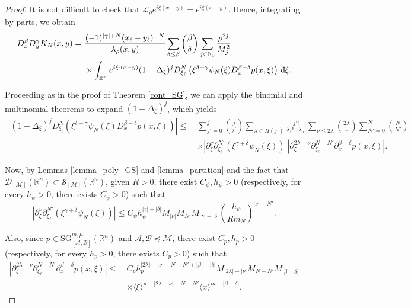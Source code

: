 \documentclass[11pt,reqno]{amsart}
\numberwithin{equation}{section}
\newcommand{\dbar}{\mathrm{d}\hspace*{-0.15em}\bar{}\hspace*{0.1em}}
\newcommand{\R}{{\mathbb{R}}} %
\newcommand{\N}{{\mathbb{N}}} %
\newcommand{\caS}{{\mathcal{S}}}
\newcommand{\SG}{{\mathrm{SG}}}
\newcommand{\M}{{\mathcal{M}}} %
\newcommand{\A}{{\mathcal{A}}} %
\newcommand{\B}{{\mathcal{B}}} %
\begin{document}
\begin{proof}
	It is not difficult to check that $\mathcal{L}_\rho e^{i\xi(x-y)} = e^{i\xi(x-y)}$. Hence, integrating by parts, we obtain
	\begin{align*}
		D_x^\beta D_y^\gamma K_N(x,y) =\ & \frac{(-1)^{|\gamma|+N}(x_\ell-y_\ell)^{-N}}{\lambda_\rho(x,y)}\sum_{\delta\leq\beta}\binom{\beta}{\delta} \sum_{j\in\N_0}\frac{\rho^{2j}}{M_j^2}\\
		& \times \int_{\R^n}e^{i\xi\cdot (x-y)}(1-\Delta_\xi)^j D_{\xi_\ell}^N\left(\xi^{\delta+\gamma}\psi_N(\xi) D_x^{\beta-\delta}p(x,\xi)\right)\,\dbar\xi.
	\end{align*}
	
	Proceeding as in the proof of Theorem \ref{cont_SG}, we can apply the binomial and multinomial theorems to expand $(1-\Delta_\xi)^j$, which yields
	\begin{align*}
		\left| (1-\Delta_\xi)^j D_{\xi_\ell}^N\left(\xi^{\delta+\gamma}\psi_N(\xi) D_x^{\beta-\delta}p(x,\xi)\right) \right| \leq\ & \sum_{j'=0}^j\binom{j}{j'}\sum_{\lambda\in\Pi(j')}\frac{j'!}{\lambda_1!\cdots\lambda_n!}\sum_{\nu\leq 2\lambda}\binom{2\lambda}{\nu}\sum_{N'=0}^N\binom{N}{N'}\\
		& \times |\partial_\xi^\nu\partial_{\xi_\ell}^{N'}(\xi^{\gamma+\delta}\psi_N(\xi))||\partial_\xi^{2\lambda-\nu}\partial_{\xi_\ell}^{N-N'}\partial_{x}^{\beta-\delta}p(x,\xi)|.
	\end{align*}
	
	Now, by Lemmas \ref{lemma_poly_GS} and \ref{lemma_partition} and the fact that $\mathcal{D}_{[\M]}(\R^n)\subset\caS_{[\M]}(\R^n)$, given $R>0$, there exist $C_\psi,h_\psi>0$ (respectively, for every $h_\psi>0$, there exists $C_\psi>0$) such that
	\begin{equation*}
		|\partial_\xi^\nu\partial_{\xi_\ell}^{N'}(\xi^{\gamma+\delta}\psi_N(\xi))| \leq C_\psi h_\psi^{|\gamma|+|\delta|} M_{|\nu|}M_{N'}M_{|\gamma|+|\delta|}\left(\frac{h_\psi}{Rm_N}\right)^{|\nu|+N'}.
	\end{equation*}
	
	Also, since $p\in {\SG}_{[\A,\B]}^{m,\mu}(\R^n)$ and $\A,\B\preceq \M$, there exist $C_p,h_p>0$ (respectively, for every $h_p>0$, there exists $C_p>0$) such that
	\begin{align*}
		|\partial_\xi^{2\lambda-\nu}\partial_{\xi_\ell}^{N-N'}\partial_{x}^{\beta-\delta}p(x,\xi)| \leq\ & C_ph_p^{|2\lambda|-|\nu|+N-N'+|\beta|-|\delta|}M_{|2\lambda|-|\nu|}M_{N-N'}M_{|\beta-\delta|}\\
		& \times \langle\xi\rangle^{\mu-|2\lambda-\nu|-N+N'} \langle x\rangle^{m-|\beta-\delta|}.
	\end{align*}
	

\end{proof}
\end{document}
